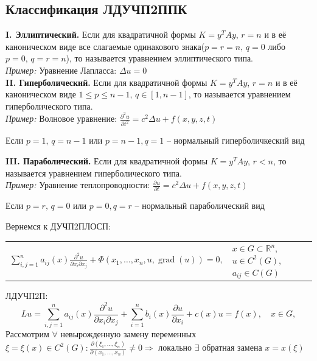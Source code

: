 \subsection{Классификация ЛДУЧП2ППК}
\textbf{I. Эллиптический.}
Если для квадратичной формы $K=y^T A y$, $r=n$ и в её каноническом виде все слагаемые одинакового знака($p=r=n,\,q=0$ либо $p=0,\,q=r=n$), то \LDUChPSPPK{} называется уравнением эллиптического типа.\smallskip\\
\emph{Пример:} Уравнение Лапласса: $\displaystyle \Delta u = 0$ \smallskip\\
\textbf{II. Гиперболический.}
Если для квадратичной формы $K = y^TAy$, $r=n$ и в её каноническом виде $1\le p \le n-1,\,q \in [1,n-1]$, то \LDUChPSPPK{} называется уравнением гиперболического типа.\medskip\\
\emph{Пример:} Волновое уравнение: $\displaystyle \frac{\partial^2 u}{\partial t^2} = c^2 \Delta u + f(x, y, z, t)$
\begin{note}
  Если $p=1,\,q=n-1$ или $p=n-1,q=1$ -- нормальный гиперболичкеский вид
\end{note}
\textbf{III. Параболический.}
Если для квадратичной формы $K = y^TAy$, $r<n$, то \LDUChPSPPK{} называется уравнением гиперболического типа.\medskip\\
\emph{Пример:} Уравнение теплопроводности: $\displaystyle \frac{\partial u}{\partial t} = c^2 \Delta u + f(x, y, z, t)$
\begin{note}
  Если $p=r,\,q=0$ или $p=0,q=r$ -- нормальный параболический вид
\end{note}
Вернемся к ДУЧП2ПЛОСП:\\
\begin{tabular}{p{} p{}}
  \hspace{1cm}\(\displaystyle 
  \sum_{i,j=1}^{n} a_{ij}(x)\frac{\partial^2u}{\partial x_i \partial x_j} + \Phi(x_1, \ldots, x_n, u, \operatorname{grad}(u)) = 0,
  \) &
  $x \in G \subset \mathbb R^n$, $u \in C^2(G)$, $a_{ij} \in C(G)$
\end{tabular}\par\medskip
ЛДУЧП2П:%
$$
Lu=\sum_{i,j=1}^{n} a_{ij}(x)\frac{\partial^2u}{\partial x_i \partial x_j} + \sum_{i=1}^{n} b_{i}(x)\frac{\partial u}{\partial x_i} + c(x)u = f(x), \quad x \in G,
$$
Рассмотрим $\forall$ невырожденную замену переменных $\displaystyle \xi=\xi(x)\in C^2(G) : \frac{\partial(\xi_1,\dots,\xi_n)}{\partial(x_1,\dots,x_n)}\ne0 \Longrightarrow$ локально $\exists$ обратная замена $x=x(\xi)$ \\
